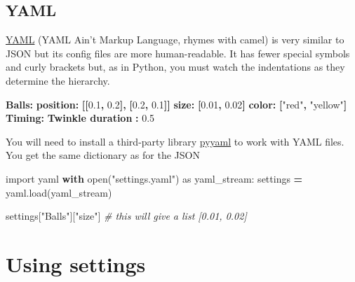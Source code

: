 \documentclass[
]{book}
\newenvironment{Shaded}{\begin{snugshade}}{\end{snugshade}}
\newcommand{\AttributeTok}[1]{\textcolor[rgb]{0.13,0.29,0.53}{#1}}
\newcommand{\BuiltInTok}[1]{#1}
\newcommand{\CommentTok}[1]{\textcolor[rgb]{0.56,0.35,0.01}{\textit{#1}}}
\newcommand{\ControlFlowTok}[1]{\textcolor[rgb]{0.13,0.29,0.53}{\textbf{#1}}}
\newcommand{\FloatTok}[1]{\textcolor[rgb]{0.00,0.00,0.81}{#1}}
\newcommand{\FunctionTok}[1]{\textcolor[rgb]{0.13,0.29,0.53}{\textbf{#1}}}
\newcommand{\ImportTok}[1]{#1}
\newcommand{\KeywordTok}[1]{\textcolor[rgb]{0.13,0.29,0.53}{\textbf{#1}}}
\newcommand{\NormalTok}[1]{#1}
\newcommand{\OperatorTok}[1]{\textcolor[rgb]{0.81,0.36,0.00}{\textbf{#1}}}
\newcommand{\StringTok}[1]{\textcolor[rgb]{0.31,0.60,0.02}{#1}}
\begin{document}
\hypertarget{yaml}{%
\subsection{YAML}\label{yaml}}

\href{https://en.wikipedia.org/wiki/YAML}{YAML} (YAML Ain't Markup Language, rhymes with camel) is very similar to JSON but its config files are more human-readable. It has fewer special symbols and curly brackets but, as in Python, you must watch the indentations as they determine the hierarchy.

\begin{Shaded}
\begin{Highlighting}[]
\FunctionTok{Balls}\KeywordTok{:}
\AttributeTok{  }\FunctionTok{position}\KeywordTok{:}\AttributeTok{ }\KeywordTok{[[}\FloatTok{0.1}\KeywordTok{,}\AttributeTok{ }\FloatTok{0.2}\KeywordTok{],}\AttributeTok{ }\KeywordTok{[}\FloatTok{0.2}\KeywordTok{,}\AttributeTok{ }\FloatTok{0.1}\KeywordTok{]]}
\AttributeTok{  }\FunctionTok{size}\KeywordTok{:}\AttributeTok{ }\KeywordTok{[}\FloatTok{0.01}\KeywordTok{,}\AttributeTok{ }\FloatTok{0.02}\KeywordTok{]}
\AttributeTok{  }\FunctionTok{color}\KeywordTok{:}\AttributeTok{ }\KeywordTok{[}\StringTok{"red"}\KeywordTok{,}\AttributeTok{ }\StringTok{"yellow"}\KeywordTok{]}
\FunctionTok{Timing}\KeywordTok{:}
\AttributeTok{  }\FunctionTok{Twinkle duration }\KeywordTok{:}\AttributeTok{ }\FloatTok{0.5}
\end{Highlighting}
\end{Shaded}

You will need to install a third-party library \href{https://pyyaml.org/}{pyyaml} to work with YAML files. You get the same dictionary as for the JSON

\begin{Shaded}
\begin{Highlighting}[]
\ImportTok{import}\NormalTok{ yaml}
\ControlFlowTok{with} \BuiltInTok{open}\NormalTok{(}\StringTok{"settings.yaml"}\NormalTok{) }\ImportTok{as}\NormalTok{ yaml\_stream:}
\NormalTok{    settings }\OperatorTok{=}\NormalTok{ yaml.load(yaml\_stream)}
    
\NormalTok{settings[}\StringTok{"Balls"}\NormalTok{][}\StringTok{"size"}\NormalTok{] }\CommentTok{\# this will give a list [0.01, 0.02]}
\end{Highlighting}
\end{Shaded}

\hypertarget{using-settings}{%
\section{Using settings}\label{using-settings}}
\end{document}
